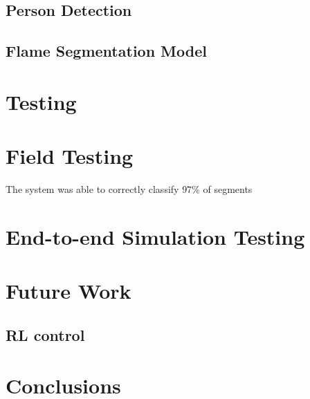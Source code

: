   \subsection{Person Detection}

  \subsection{Flame Segmentation Model}

\section{Testing}

  \section{Field Testing}

  The system was able to correctly classify $97\%$ of segments

  \section{End-to-end Simulation Testing}

\section{Future Work}\label{sec:future_work}

  \subsection{RL control}

\section{Conclusions}\label{sec:conclusions}


